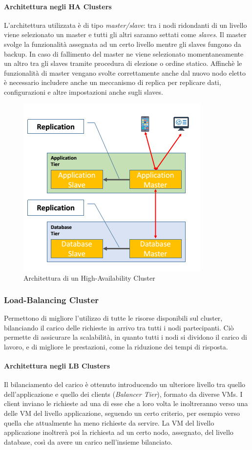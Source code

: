 \documentclass{article}
\begin{document}
\paragraph{Architettura negli HA Clusters} L’architettura utilizzata è di tipo \textit{master/slave}: tra i nodi ridondanti di un livello viene selezionato un master e tutti gli altri saranno settati come \textit{slaves}.
Il master svolge la funzionalità assegnata ad un certo livello mentre gli slaves fungono da backup. In caso di fallimento del master ne viene selezionato momentaneamente un altro tra gli slaves tramite procedura di elezione o ordine statico.
Affinchè le funzionalità di master vengano svolte correttamente anche dal nuovo nodo eletto è necessario includere anche un meccanismo di replica per replicare dati, configurazioni e altre impostazioni anche sugli slaves.
\begin{figure}[H]
\centering
\includegraphics[scale=0.6]{img/HACluster_Arch.png}
\caption{Architettura di un High-Availability Cluster}
\end{figure}

\subsubsection{Load-Balancing Cluster}
Permettono di migliore l’utilizzo di tutte le risorse disponibili sul cluster, bilanciando il carico delle richieste in arrivo tra tutti i nodi partecipanti. Ciò permette di assicurare la scalabilità, in quanto tutti i nodi si dividono il carico di lavoro, e di migliore le prestazioni, come la riduzione dei tempi di risposta.

\paragraph{Architettura negli LB Clusters} Il bilanciamento del carico è ottenuto introducendo un ulteriore livello tra quello dell’applicazione e quello dei clients (\textit{Balancer Tier}), formato da diverse VMs. I client inviano le richieste ad una di esse che a loro volta le inoltreranno verso una delle VM del livello applicazione, seguendo un certo criterio, per esempio verso quella che attualmente ha meno richieste da servire. La VM del livello applicazione inoltrerà poi la richiesta ad un certo nodo, assegnato, del livello database, così da avere un carico nell’insieme bilanciato.
\end{document}

